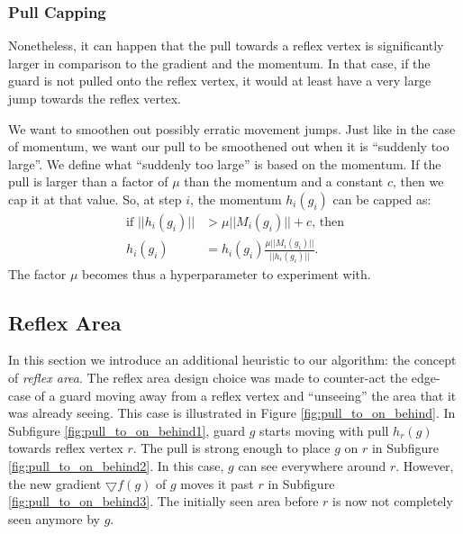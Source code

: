 \subsubsection{Pull Capping}
\label{sec:pull_capping}
Nonetheless, it can happen that the pull towards a reflex vertex is significantly larger in comparison to the gradient and the momentum. In that case, if the guard is not pulled onto the reflex vertex, it would at least have a very large jump towards the reflex vertex.

We want to smoothen out possibly erratic movement jumps. Just like in the case of momentum, we want our pull to be smoothened out when it is ``suddenly too large''. We define what ``suddenly too large'' is based on the momentum. If the pull is larger than a factor of $\mu$ than the momentum and a constant $c$, then we cap it at that value. So, at step $i$, the momentum $h_i(g_i)$ can be capped as:
\begin{align*}
    \text{if } ||h_i(g_i)|| &> \mu ||M_i(g_i)|| + c \text{, then} \\
               h_i(g_i) &= h_i(g_i) \frac{\mu ||M_i(g_i)||}{||h_i(g_i)||}.
\end{align*}
The factor $\mu$ becomes thus a hyperparameter to experiment with.


\subsection{Reflex Area}
\label{sec:reflex_area}
In this section we introduce an additional heuristic to our algorithm: the concept of \textit{reflex area}. The reflex area design choice was made to counter-act the edge-case of a guard moving away from a reflex vertex and ``unseeing'' the area that it was already seeing. This case is illustrated in Figure \ref{fig:pull_to_on_behind}. In Subfigure \ref{fig:pull_to_on_behind1}, guard $g$ starts moving with pull $h_r(g)$ towards reflex vertex $r$. The pull is strong enough to place $g$ on $r$ in Subfigure \ref{fig:pull_to_on_behind2}. In this case, $g$ can see everywhere around $r$. However, the new gradient $\bigtriangledown f(g)$ of $g$ moves it past $r$ in Subfigure \ref{fig:pull_to_on_behind3}. The initially seen area before $r$ is now not completely seen anymore by $g$.

